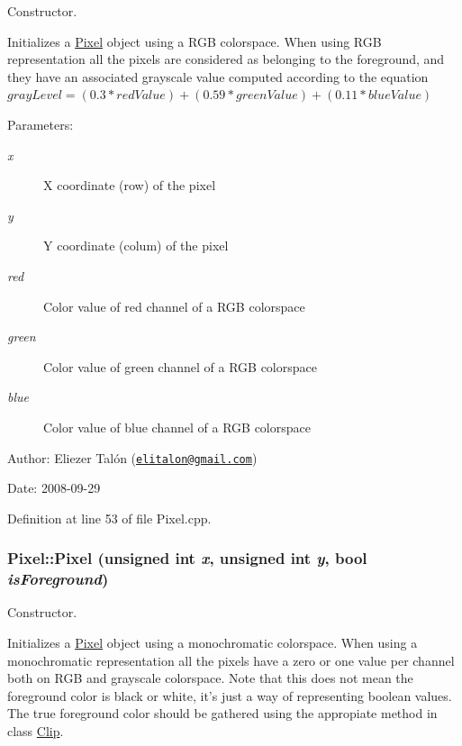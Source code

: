 Constructor. 

Initializes a \hyperlink{class_pixel}{Pixel} object using a RGB colorspace. When using RGB representation all the pixels are considered as belonging to the foreground, and they have an associated grayscale value computed according to the equation $grayLevel = (0.3 * redValue) + (0.59 * greenValue) + (0.11 * blueValue) $

\begin{Desc}
\item[Parameters:]
\begin{description}
\item[{\em x}]X coordinate (row) of the pixel \item[{\em y}]Y coordinate (colum) of the pixel \item[{\em red}]Color value of red channel of a RGB colorspace \item[{\em green}]Color value of green channel of a RGB colorspace \item[{\em blue}]Color value of blue channel of a RGB colorspace\end{description}
\end{Desc}
\begin{Desc}
\item[Author:]Eliezer Talón (\href{mailto:elitalon@gmail.com}{\tt elitalon@gmail.com}) \end{Desc}
\begin{Desc}
\item[Date:]2008-09-29 \end{Desc}


Definition at line 53 of file Pixel.cpp.\hypertarget{class_pixel_3138f81f8e7ea10f6764f47136129ad0}{
\subsubsection[Pixel]{\setlength{\rightskip}{0pt plus 5cm}Pixel::Pixel (unsigned int {\em x}, \/  unsigned int {\em y}, \/  bool {\em isForeground})}}
\label{class_pixel_3138f81f8e7ea10f6764f47136129ad0}


Constructor. 

Initializes a \hyperlink{class_pixel}{Pixel} object using a monochromatic colorspace. When using a monochromatic representation all the pixels have a zero or one value per channel both on RGB and grayscale colorspace. Note that this does not mean the foreground color is black or white, it's just a way of representing boolean values. The true foreground color should be gathered using the appropiate method in class \hyperlink{class_clip}{Clip}.

